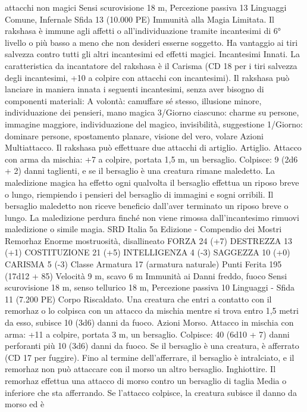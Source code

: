 \begin{multicols}{2}
attacchi non magici
Sensi scurovisione 18 m, Percezione passiva 13
Linguaggi Comune, Infernale
Sfida 13 (10.000 PE)
Immunità alla Magia Limitata. Il rakshasa è immune agli affetti
o all’individuazione tramite incantesimi di 6° livello o più basso
a meno che non desideri esserne soggetto. Ha vantaggio ai tiri
salvezza contro tutti gli altri incantesimi ed effetti magici.
Incantesimi Innati. La caratteristica da incantatore del rakshasa
è il Carisma (CD 18 per i tiri salvezza degli incantesimi, +10 a
colpire con attacchi con incantesimi). Il rakshasa può lanciare in
maniera innata i seguenti incantesimi, senza aver bisogno di
componenti materiali:
A volontà: camuffare sé stesso, illusione minore, individuazione
dei pensieri, mano magica
3/Giorno ciascuno: charme su persone, immagine maggiore,
individuazione del magico, invisibilità, suggestione
1/Giorno: dominare persone, spostamento planare, visione del
vero, volare
Azioni
Multiattacco. Il rakshasa può effettuare due attacchi di artiglio.
Artiglio. Attacco con arma da mischia: +7 a colpire, portata 1,5
m, un bersaglio.
Colpisce: 9 (2d6 + 2) danni taglienti, e se il bersaglio è una
creatura rimane maledetto. La maledizione magica ha effetto
ogni qualvolta il bersaglio effettua un riposo breve o lungo,
riempiendo i pensieri del bersaglio di immagini e sogni orribili.
Il bersaglio maledetto non riceve beneficio dall’aver terminato
un riposo breve o lungo. La maledizione perdura finché non
viene rimossa dall’incantesimo rimuovi maledizione o simile
magia.
SRD Italia 5a Edizione - Compendio dei Mostri
Remorhaz
Enorme mostruosità, disallineato
FORZA 24 (+7)
DESTREZZA 13 (+1)
COSTITUZIONE 21 (+5)
INTELLIGENZA 4 (-3)
SAGGEZZA 10 (+0)
CARISMA 5 (-3)
Classe Armatura 17 (armatura naturale)
Punti Ferita 195 (17d12 + 85)
Velocità 9 m, scavo 6 m
Immunità ai Danni freddo, fuoco
Sensi scurovisione 18 m, senso tellurico 18 m, Percezione
passiva 10
Linguaggi -
Sfida 11 (7.200 PE)
Corpo Riscaldato. Una creatura che entri a contatto con il
remorhaz o lo colpisca con un attacco da mischia mentre si trova
entro 1,5 metri da esso, subisce 10 (3d6) danni da fuoco.
Azioni
Morso. Attacco in mischia con arma: +11 a colpire, portata 3 m,
un bersaglio.
Colpisce: 40 (6d10 + 7) danni perforanti più 10 (3d6) danni da
fuoco. Se il bersaglio è una creatura, è afferrato (CD 17 per
fuggire). Fino al termine dell’afferrare, il bersaglio è intralciato,
e il remorhaz non può attaccare con il morso un altro bersaglio.
Inghiottire. Il remorhaz effettua una attacco di morso contro un
bersaglio di taglia Media o inferiore che sta afferrando. Se
l’attacco colpisce, la creatura subisce il danno da morso ed è

\end{multicols}
